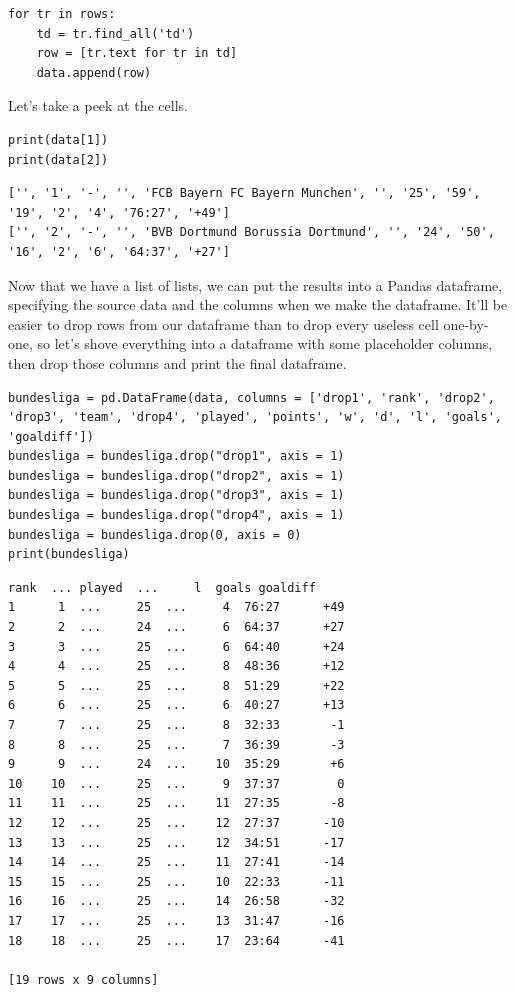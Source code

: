 \begin{lstlisting}[style=pippython]
for tr in rows:
	td = tr.find_all('td')
	row = [tr.text for tr in td]
	data.append(row)
\end{lstlisting}
Let's take a peek at the cells.
\begin{lstlisting}[style=pippython]
print(data[1])
print(data[2])
\end{lstlisting}
\begin{lstlisting}[style=none]
['', '1', '-', '', 'FCB Bayern FC Bayern Munchen', '', '25', '59', '19', '2', '4', '76:27', '+49']
['', '2', '-', '', 'BVB Dortmund Borussia Dortmund', '', '24', '50', '16', '2', '6', '64:37', '+27']
\end{lstlisting}
Now that we have a list of lists, we can put the results into a Pandas dataframe, specifying the source data and the columns when we make the dataframe. It'll be easier to drop rows from our dataframe than to drop every useless cell one-by-one, so let's shove everything into a dataframe with some placeholder columns, then drop those columns and print the final dataframe.\par
\begin{lstlisting}[style=pippython]
bundesliga = pd.DataFrame(data, columns = ['drop1', 'rank', 'drop2', 'drop3', 'team', 'drop4', 'played', 'points', 'w', 'd', 'l', 'goals', 'goaldiff'])
bundesliga = bundesliga.drop("drop1", axis = 1)
bundesliga = bundesliga.drop("drop2", axis = 1)
bundesliga = bundesliga.drop("drop3", axis = 1)
bundesliga = bundesliga.drop("drop4", axis = 1)
bundesliga = bundesliga.drop(0, axis = 0)
print(bundesliga)
\end{lstlisting}
\begin{lstlisting}[style=none]
    rank  ... played  ...     l  goals goaldiff
1      1  ...     25  ...     4  76:27      +49
2      2  ...     24  ...     6  64:37      +27
3      3  ...     25  ...     6  64:40      +24
4      4  ...     25  ...     8  48:36      +12
5      5  ...     25  ...     8  51:29      +22
6      6  ...     25  ...     6  40:27      +13
7      7  ...     25  ...     8  32:33       -1
8      8  ...     25  ...     7  36:39       -3
9      9  ...     24  ...    10  35:29       +6
10    10  ...     25  ...     9  37:37        0
11    11  ...     25  ...    11  27:35       -8
12    12  ...     25  ...    12  27:37      -10
13    13  ...     25  ...    12  34:51      -17
14    14  ...     25  ...    11  27:41      -14
15    15  ...     25  ...    10  22:33      -11
16    16  ...     25  ...    14  26:58      -32
17    17  ...     25  ...    13  31:47      -16
18    18  ...     25  ...    17  23:64      -41

[19 rows x 9 columns]
\end{lstlisting}

